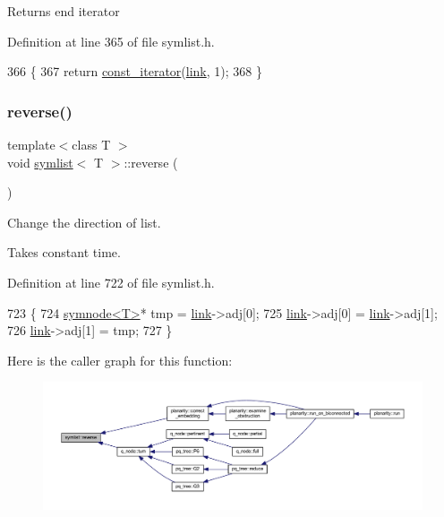\begin{DoxyReturn}{Returns}
end iterator 
\end{DoxyReturn}


Definition at line 365 of file symlist.\+h.


\begin{DoxyCode}
366     \{
367     \textcolor{keywordflow}{return} \mbox{\hyperlink{classsymlist_af15c0ca931299054f83d17a1580a5159}{const\_iterator}}(\mbox{\hyperlink{classsymlist_a8fa81a7f6d0bb986bb593776db582c90}{link}}, 1);
368     \}
\end{DoxyCode}
\mbox{\label{classsymlist_ae22b65101604c694e96974cc9579ab78}} 
\subsubsection{\texorpdfstring{reverse()}{reverse()}}
{\footnotesize\ttfamily template$<$class T $>$ \\
void \mbox{\hyperlink{classsymlist}{symlist}}$<$ T $>$\+::reverse (\begin{DoxyParamCaption}{ }\end{DoxyParamCaption})\hspace{0.3cm}{\ttfamily [inline]}}



Change the direction of list. 

Takes constant time. 

Definition at line 722 of file symlist.\+h.


\begin{DoxyCode}
723 \{
724     \mbox{\hyperlink{structsymnode}{symnode<T>}}* tmp = \mbox{\hyperlink{classsymlist_a8fa81a7f6d0bb986bb593776db582c90}{link}}->adj[0];
725     \mbox{\hyperlink{classsymlist_a8fa81a7f6d0bb986bb593776db582c90}{link}}->adj[0] = \mbox{\hyperlink{classsymlist_a8fa81a7f6d0bb986bb593776db582c90}{link}}->adj[1];
726     \mbox{\hyperlink{classsymlist_a8fa81a7f6d0bb986bb593776db582c90}{link}}->adj[1] = tmp;
727 \}
\end{DoxyCode}
Here is the caller graph for this function\+:\nopagebreak
\begin{figure}[H]
\begin{center}
\leavevmode
\includegraphics[width=350pt]{classsymlist_ae22b65101604c694e96974cc9579ab78_icgraph}
\end{center}
\end{figure}
\mbox{\label{classsymlist_ac2bd4d9db62ea6a3282662c62a97c3b2}} 
